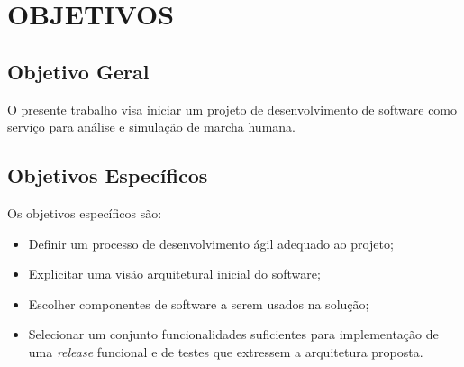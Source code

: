 \section[OBJETIVOS]{OBJETIVOS}

\subsection[Objetivo Geral]{\textbf{Objetivo Geral}}
O presente trabalho visa iniciar um projeto de desenvolvimento de software como serviço para análise e simulação de marcha humana.

\subsection[Objetivo Específicos]{\textbf{Objetivos Específicos}}
Os objetivos específicos são:
\begin{itemize}
	\item Definir um processo de desenvolvimento ágil adequado ao projeto;
	\item Explicitar uma visão arquitetural inicial do software;
	\item Escolher componentes de software a serem usados na solução;
	\item Selecionar um conjunto funcionalidades suficientes para implementação de uma \emph{release} funcional e de testes que extressem a arquitetura proposta.
\end{itemize}
